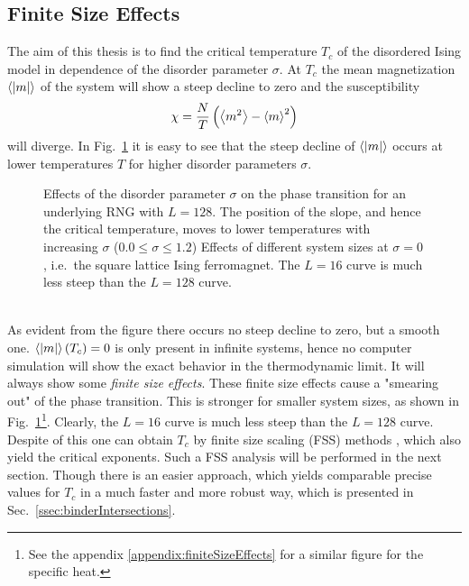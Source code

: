 \subsection{Finite Size Effects}
\label{ssec:finitesize}
    The aim of this thesis is to find the critical temperature \(T_c\)
    of the disordered Ising model in dependence of the disorder parameter
    \(\sigma\). At \(T_c\) the mean magnetization \(\left< |m| \right>\) of
    the system will show a steep decline to zero and the susceptibility
    \begin{equation}
        \chi = \frac{N}{T}\left(\left< m^2 \right>-\left< m \right>^2\right)
    \end{equation}
    will diverge. In Fig.\ \ref{fig:smeared_out}
    it is easy to see that the steep decline of \(\left< |m| \right>\)
    occurs at lower temperatures \(T\) for higher
    disorder parameters \(\sigma\).
    \begin{figure}[htbp]
        \centering
        \caption[Phase Transition and Finite Size Effects]
        {
             Effects of the disorder
            parameter $\sigma$ on the phase transition
            for an underlying RNG with $L=128$. The position of the slope,
            and hence the critical temperature, moves to lower temperatures
            with increasing \(\sigma\) (\(0.0 \le \sigma \le 1.2\))
             Effects of different system
            sizes at \(\sigma = 0\), i.e.\ the square lattice Ising ferromagnet.
            The \(L=16\) curve is much less steep than the \(L=128\) curve.
        }
        \label{fig:smeared_out}
    \end{figure}\\
    As evident from the figure there occurs no steep decline to zero, but a
    smooth one. \(\left< \left\vert m\right\vert \right>(T_c) = 0\) is only present in infinite
    systems, hence no computer simulation will show the exact behavior in the
    thermodynamic limit. It will always show some \emph{finite size effects}.
    These finite size effects cause a "smearing out" of the phase
    transition. This is stronger for smaller system sizes, as shown
    in Fig.\ \ref{fig:smeared_out}\footnote{See the appendix \ref{appendix:finiteSizeEffects} for a similar figure for the specific heat.}.
    Clearly, the \(L=16\) curve is much less steep than the \(L=128\) curve.\\
    Despite of this one can obtain \(T_c\) by finite size scaling (FSS)
    methods \cite[p. 232ff]{NewmanBarkema1999}, which also yield the critical
    exponents. Such a FSS analysis will be performed in the next section.
    Though there is an easier approach, which yields comparable precise
    values for \(T_{c}\) in a much faster and more robust way, which is
    presented in Sec.\ \ref{ssec:binderIntersections}.

